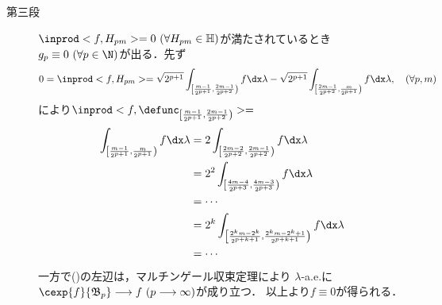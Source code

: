 \begin{prf}
\begin{description}
			\item[第三段]
				$\inprod<f,H_{pm}> = 0\ (\forall H_{pm} \in \mathbb{H})$が満たされているとき
				$g_p \equiv 0\ (\forall p \in \N)$が出る．先ず
				\begin{align}
					0 = \inprod<f,H_{pm}> 
					= \sqrt{2^{p+1}} \int_{\left[ \frac{m-1}{2^{p+1}}, \frac{2m-1}{2^{p+2}} \right)} f \dx\lambda
						-  \sqrt{2^{p+1}} \int_{\left[ \frac{2m-1}{2^{p+2}}, \frac{m}{2^{p+1}} \right)} f \dx\lambda
					,\quad (\forall p,m)
				\end{align}
				により$\inprod<f,\defunc_{\left[ \frac{m-1}{2^{p+1}}, \frac{2m-1}{2^{p+2}} \right)}> = $
				\begin{align}
					\int_{\left[ \frac{m-1}{2^{p+1}}, \frac{m}{2^{p+1}} \right)} f \dx\lambda
					&= 2 \int_{\left[ \frac{2m-2}{2^{p+2}}, \frac{2m-1}{2^{p+2}} \right)} f \dx\lambda \\
					&= 2^2 \int_{\left[ \frac{4m-4}{2^{p+3}}, \frac{4m-3}{2^{p+3}} \right)} f \dx\lambda \\
					&= \cdots \\
					&= 2^k \int_{\left[ \frac{2^km-2^k}{2^{p+k+1}}, \frac{2^km-2^k+1}{2^{p+k+1}} \right)} f \dx\lambda \\
					&= \cdots
				\end{align}
				一方で()の左辺は，マルチンゲール収束定理により
				$\lambda$-a.e.に$\cexp{f}{\mathfrak{B}_p} \longrightarrow f\ (p \longrightarrow \infty)$が成り立つ．
				以上より$f \equiv 0$が得られる．
				\QED
		\end{description}
	\end{prf}